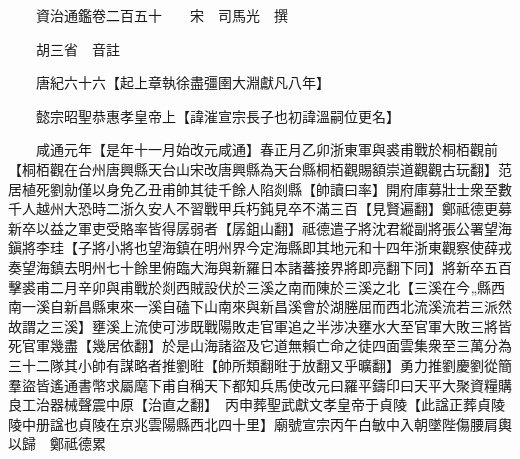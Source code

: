 










 


 
 


 

  
  
  
  
  





  
  
  
  
  
 
  

  

  
  
  



  

 
 

  
   




  

  
  


  　　資治通鑑卷二百五十　　宋　司馬光　撰

　　胡三省　音註

　　唐紀六十六【起上章執徐盡彊圉大淵獻凡八年】

　　懿宗昭聖恭惠孝皇帝上【諱漼宣宗長子也初諱溫嗣位更名】

　　咸通元年【是年十一月始改元咸通】春正月乙卯浙東軍與裘甫戰於桐栢觀前【桐栢觀在台州唐興縣天台山宋改唐興縣為天台縣桐栢觀賜額崇道觀觀古玩翻】范居植死劉勍僅以身免乙丑甫帥其徒千餘人陷剡縣【帥讀曰率】開府庫募壯士衆至數千人越州大恐時二浙久安人不習戰甲兵朽鈍見卒不滿三百【見賢遍翻】鄭祗德更募新卒以益之軍吏受賂率皆得孱弱者【孱鉏山翻】祗德遣子將沈君縱副將張公署望海鎭將李珪【子將小將也望海鎮在明州界今定海縣即其地元和十四年浙東觀察使薛戎奏望海鎮去明州七十餘里俯臨大海與新羅日本諸蕃接界將即亮翻下同】將新卒五百擊裘甫二月辛卯與甫戰於剡西賊設伏於三溪之南而陳於三溪之北【三溪在今縣西南一溪自新昌縣東來一溪自磕下山南來與新昌溪會於湖塍屈而西北流溪流若三派然故謂之三溪】壅溪上流使可涉既戰陽敗走官軍追之半涉决壅水大至官軍大敗三將皆死官軍幾盡【幾居依翻】於是山海諸盜及它道無賴亡命之徒四面雲集衆至三萬分為三十二隊其小帥有謀略者推劉暀【帥所類翻暀于放翻又乎曠翻】勇力推劉慶劉從簡羣盜皆遙通書幣求屬麾下甫自稱天下都知兵馬使改元曰羅平鑄印曰天平大聚資糧購良工治器械聲震中原【治直之翻】　丙申葬聖武獻文孝皇帝于貞陵【此諡正葬貞陵陵中册諡也貞陵在京兆雲陽縣西北四十里】廟號宣宗丙午白敏中入朝墜陛傷腰肩輿以歸　鄭祗德累

